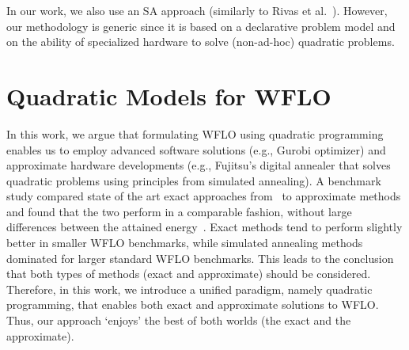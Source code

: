 \documentclass[preprint,12pt]{elsarticle}
\newcommand{\todo}[1]{{\textcolor{red}{\bf {#1}}}}
\begin{document}
In our work, we also use an SA approach (similarly to Rivas et al.\ \cite{rivas2009solving}). However,
our methodology is generic since it is based on a declarative problem model and
on the ability of specialized hardware to solve (non-ad-hoc) quadratic problems.




%
%
%
%
%
%


\section{Quadratic Models for WFLO}
\label{sec:QUBO4WFLO}

In this work, we argue that 
formulating WFLO using quadratic programming enables us to employ 
advanced software solutions (e.g., Gurobi optimizer) and approximate hardware developments 
(e.g., Fujitsu's digital annealer that solves quadratic problems using principles from simulated annealing). 
A benchmark study compared state of the art exact approaches from~\cite{Zhang2014} to 
approximate methods and found that the two perform in a comparable fashion, without large differences between
the attained energy~\cite{yang2019simulated}. Exact methods tend to perform slightly better
in smaller WFLO benchmarks, while simulated annealing methods dominated for larger standard WFLO benchmarks. 
This leads to the conclusion that both types of methods (exact and approximate) should be considered. 
Therefore, in this work, we introduce a unified paradigm, namely quadratic programming, that enables
both exact and approximate solutions to WFLO. Thus, 
our approach `enjoys' the best of both worlds (the exact and the approximate). 
\end{document}
